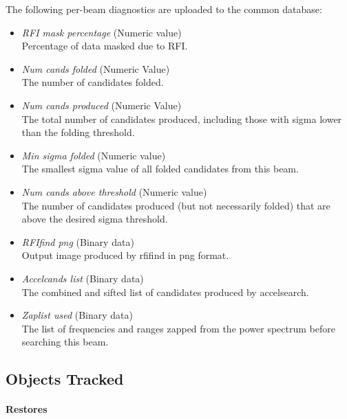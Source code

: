 \documentclass[12pt]{article}
\begin{document}
The following per-beam diagnostics are uploaded to the common database:
\begin{itemize}
    \item \textit{RFI mask percentage} (Numeric value) \hfill \\
        Percentage of data masked due to RFI.

    \item \textit{Num cands folded} (Numeric Value) \hfill \\
        The number of candidates folded.

    \item \textit{Num cands produced} (Numeric Value) \hfill \\
        The total number of candidates produced, including those with sigma lower than the folding threshold.

    \item \textit{Min sigma folded} (Numeric value) \hfill \\
        The smallest sigma value of all folded candidates from this beam.

    \item \textit{Num cands above threshold} (Numeric value) \hfill \\
        The number of candidates produced (but not necessarily folded) that are above the desired sigma threshold.
    
    \item \textit{RFIfind png} (Binary data) \hfill \\
        Output image produced by rfifind in png format.

    \item \textit{Accelcands list} (Binary data) \hfill \\
        The combined and sifted list of candidates produced by accelsearch.
    
    \item \textit{Zaplist used} (Binary data) \hfill \\
        The list of frequencies and ranges zapped from the power spectrum before searching this beam.
\end{itemize}

\subsection{Objects Tracked}
\paragraph{Restores}
\end{document}

